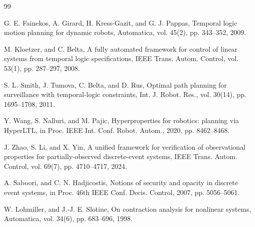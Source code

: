 \documentclass[letterpaper, 10 pt, conference]{ieeeconf}  %
\begin{document}
\begin{thebibliography}{99}




 G. E. Fainekos, A. Girard, H. Kress-Gazit, and G. J. Pappas, Temporal logic motion planning for dynamic robots, Automatica, vol. 45(2), pp. 343--352, 2009.

 M. Kloetzer, and C. Belta, A fully automated framework for control of linear systems from temporal logic specifications, IEEE Trans. Autom. Control, vol. 53(1), pp. 287--297, 2008.



 S. L. Smith, J. Tumova, C. Belta, and D. Rus, Optimal path planning for surveillance with temporal-logic constraints, Int. J. Robot. Res., vol. 30(14), pp. 1695--1708, 2011.

 Y. Wang, S. Nalluri, and M. Pajic, Hyperproperties for robotics: planning via HyperLTL, in Proc. IEEE Int. Conf. Robot. Autom., 2020, pp. 8462--8468.

 J. Zhao, S. Li, and X. Yin, A unified framework for verification of observational properties for partially-observed discrete-event systems, IEEE Trans. Autom. Control, vol. 69(7), pp. 4710--4717, 2024.

 A. Saboori, and C. N. Hadjicostis, Notions of security and opacity in discrete event systems, in Proc. 46th IEEE Conf. Decis. Control, 2007, pp. 5056--5061.

 W. Lohmiller, and J.-J. E. Slotine, On contraction analysis for nonlinear systems, Automatica, vol. 34(6), pp. 683--696, 1998.


\end{thebibliography}
\end{document}
